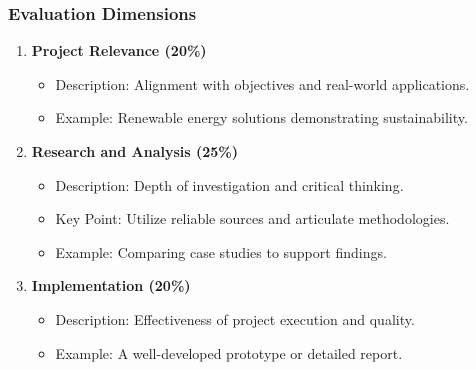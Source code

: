 \documentclass[aspectratio=169]{beamer}
\begin{document}
\begin{frame}[fragile]
    \frametitle{Evaluation Dimensions}
    \begin{enumerate}
        \item \textbf{Project Relevance (20\%)}
            \begin{itemize}
                \item Description: Alignment with objectives and real-world applications.
                \item Example: Renewable energy solutions demonstrating sustainability.
            \end{itemize}
            
        \item \textbf{Research and Analysis (25\%)}
            \begin{itemize}
                \item Description: Depth of investigation and critical thinking.
                \item Key Point: Utilize reliable sources and articulate methodologies.
                \item Example: Comparing case studies to support findings.
            \end{itemize}
         
        \item \textbf{Implementation (20\%)}
            \begin{itemize}
                \item Description: Effectiveness of project execution and quality.
                \item Example: A well-developed prototype or detailed report.
            \end{itemize}
    \end{enumerate}
\end{frame}
\end{document}

